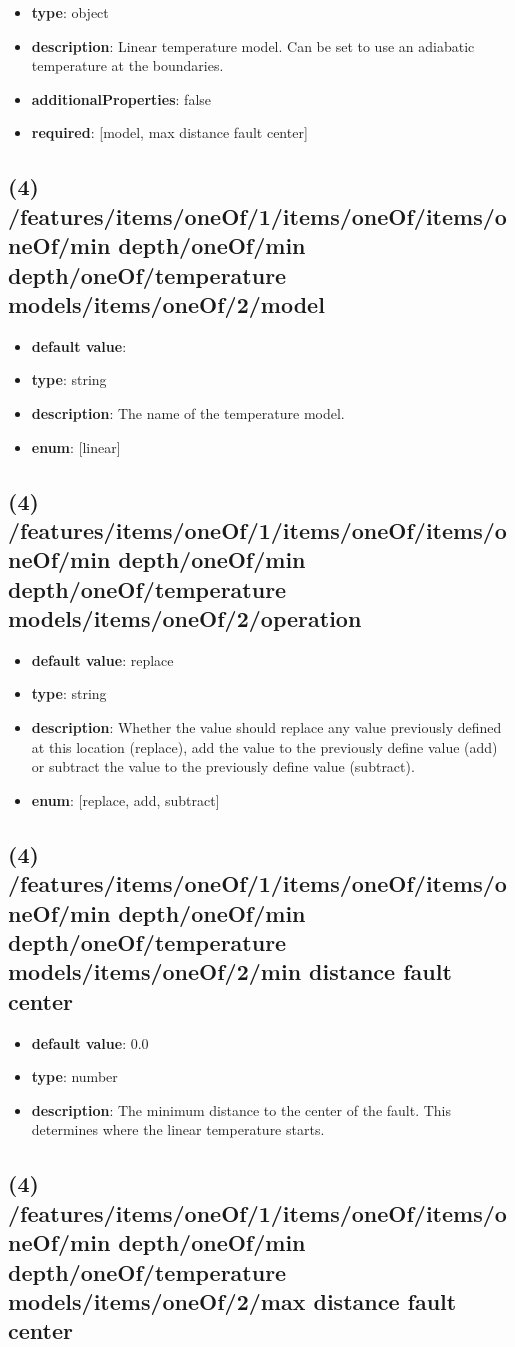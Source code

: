 \begin{itemize}[leftmargin=3em]\item {\bf type}: object
\item {\bf description}: Linear temperature model. Can be set to use an adiabatic temperature at the boundaries.
\item {\bf additionalProperties}: false
\item {\bf required}: [model, max distance fault center]\end{itemize}
\subsection{(4) /features/items/oneOf/1/items/oneOf/items/oneOf/min depth/oneOf/min depth/oneOf/temperature models/items/oneOf/2/model}
\begin{itemize}[leftmargin=4em]\item {\bf default value}: 
\item {\bf type}: string
\item {\bf description}: The name of the temperature model.
\item {\bf enum}: [linear]\end{itemize}\subsection{(4) /features/items/oneOf/1/items/oneOf/items/oneOf/min depth/oneOf/min depth/oneOf/temperature models/items/oneOf/2/operation}
\begin{itemize}[leftmargin=4em]\item {\bf default value}: replace
\item {\bf type}: string
\item {\bf description}: Whether the value should replace any value previously defined at this location (replace), add the value to the previously define value (add) or subtract the value to the previously define value (subtract).
\item {\bf enum}: [replace, add, subtract]\end{itemize}\subsection{(4) /features/items/oneOf/1/items/oneOf/items/oneOf/min depth/oneOf/min depth/oneOf/temperature models/items/oneOf/2/min distance fault center}
\begin{itemize}[leftmargin=4em]\item {\bf default value}: 0.0
\item {\bf type}: number
\item {\bf description}: The minimum distance to the center of the fault. This determines where the linear temperature starts.
\end{itemize}\subsection{(4) /features/items/oneOf/1/items/oneOf/items/oneOf/min depth/oneOf/min depth/oneOf/temperature models/items/oneOf/2/max distance fault center}
